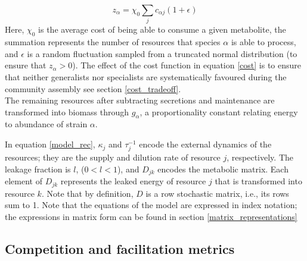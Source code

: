 \documentclass[12pt]{article}
\begin{document}
        	\begin{equation}\label{cost}
        	    z_{\alpha} = \chi_0\sum_j c_{\alpha j} (1 + \epsilon)
        	\end{equation}
        	Here, $\chi_0$ is the average cost of being able to consume a given metabolite, the summation represents the number of resources that species $\alpha$ is able to process, and $\epsilon$ is a random fluctuation sampled from a truncated normal distribution (to ensure that $z_{\alpha} > 0$). The effect of the cost function in equation \ref{cost} is to ensure that neither generalists nor specialists are systematically favoured during the community assembly see section \ref{cost_tradeoff}.\\
        	The remaining resources after subtracting secretions and maintenance are transformed into biomass through $ g_{\alpha} $, a proportionality constant relating energy to abundance of strain $ {\alpha} $. \par 
        	In equation \ref{model_rec}, $ \kappa_j $ and $ \tau_j^{-1} $ encode the external dynamics of the resources; they are the supply and dilution rate of resource  $ j $, respectively. The leakage fraction is $ l $, ($ 0 < l < 1 $), and $ D_{jk} $ encodes the metabolic matrix. Each element of $ D_{jk} $ represents the leaked energy of resource $ j $ that is transformed into resource $ k $. Note that by definition, $ D $ is a row stochastic matrix, i.e., its rows sum to 1. Note that the equations of the model are expressed in index notation; the expressions in matrix form can be found in section \ref{matrix_representations}\par
        	
        \subsection{Competition and facilitation metrics}\label{metrics}
        	
\end{document}
